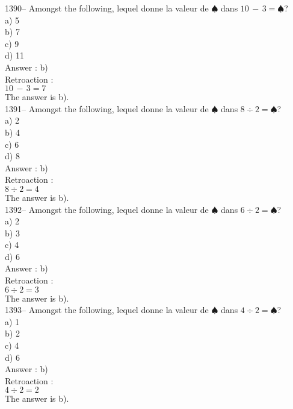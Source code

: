 ﻿\documentclass[letterpaper, 12pt]{article}
\begin{document}
1390-- Amongst the following, lequel donne la valeur de
$\spadesuit$ dans $10\,-\,3=\spadesuit$?\\
a) 5\\
b) 7\\
c) 9\\
d) 11\\

Answer : b)\\

Retroaction : \\
$10\,-\,3=7$\\
The answer is b).\\

1391-- Amongst the following, lequel donne la valeur de
$\spadesuit$ dans $8\div2=\spadesuit$?\\
a) 2\\
b) 4\\
c) 6\\
d) 8\\

Answer : b)\\

Retroaction : \\
$8\div2=4$\\
The answer is b).\\

1392-- Amongst the following, lequel donne la valeur de
$\spadesuit$ dans $6\div2=\spadesuit$?\\
a) 2\\
b) 3\\
c) 4\\
d) 6\\

Answer : b)\\

Retroaction : \\
$6\div2=3$\\
The answer is b).\\

1393-- Amongst the following, lequel donne la valeur de
$\spadesuit$ dans $4\div2=\spadesuit$?\\
a) 1\\
b) 2\\
c) 4\\
d) 6\\

Answer : b)\\

Retroaction : \\
$4\div2=2$\\
The answer is b).\\
\end{document}
